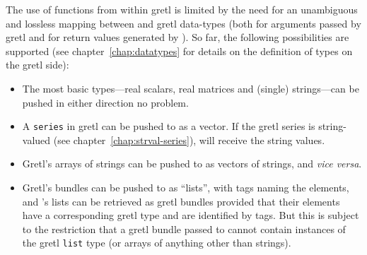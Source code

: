 The use of  functions from within gretl is limited by the need
for an unambiguous and lossless mapping between  and gretl
data-types (both for arguments passed by gretl and for return values
generated by ). So far, the following possibilities are
supported (see chapter~\ref{chap:datatypes} for details on the
definition of types on the gretl side):
\begin{itemize}
\item The most basic types---real scalars, real matrices and (single)
  strings---can be pushed in either direction no problem.
\item A \texttt{series} in gretl can be pushed to  as a
  vector. If the gretl series is string-valued (see
  chapter~\ref{chap:strval-series}),  will receive the string
  values.
\item Gretl's arrays of strings can be pushed to  as vectors of
  strings, and \textit{vice versa}.
\item Gretl's bundles can be pushed to  as ``lists'', with tags
  naming the elements, and 's lists can be retrieved as gretl
  bundles provided that their elements have a corresponding gretl type
  and are identified by tags. But this is subject to the restriction
  that a gretl bundle passed to  cannot contain instances of
  the gretl \texttt{list} type (or arrays of anything other than
  strings).
\end{itemize}


